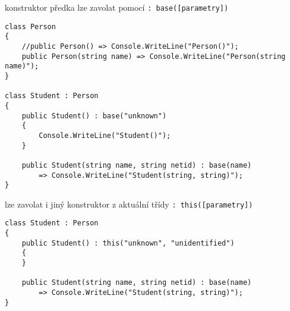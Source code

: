 \begin{frame}[fragile]
\begin{bitemize}{}
\item konstruktor předka lze zavolat pomocí \lstinline|: base([parametry])|
\end{bitemize}
\vfill
\begin{yesblock}
\begin{lstlisting}[basicstyle=\small]
class Person
{
    //public Person() => Console.WriteLine("Person()");
    public Person(string name) => Console.WriteLine("Person(string name)");
}

class Student : Person
{
    public Student() : base("unknown") 
    {
        Console.WriteLine("Student()");
    }

    public Student(string name, string netid) : base(name) 
        => Console.WriteLine("Student(string, string)");
}
\end{lstlisting}
\end{yesblock}
\end{frame}




\begin{frame}[fragile]
\begin{bitemize}{}
\item lze zavolat i jiný konstruktor z aktuální třídy \lstinline|: this([parametry])|
\end{bitemize}
\vfill
\begin{yesblock}
\begin{lstlisting}[basicstyle=\small]
class Student : Person
{
    public Student() : this("unknown", "unidentified") 
    { 
    }

    public Student(string name, string netid) : base(name) 
        => Console.WriteLine("Student(string, string)");
}
\end{lstlisting}
\end{yesblock}
\end{frame}






